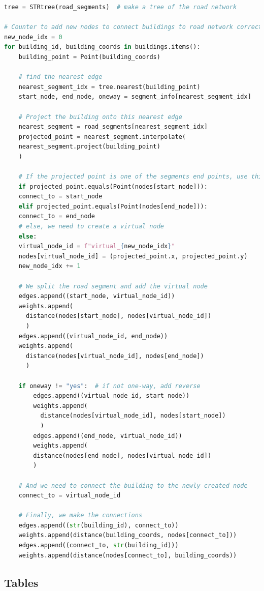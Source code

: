 \documentclass[12pt]{article}
\numberwithin{equation}{section}
\newcommand{\1}[1]{\,I_{#1}} %
\begin{document}
\begin{lstlisting}[language=Python, caption={The algorithm to extract the edges to connect the buildings to the road network}, label={lst:python-edges}]
tree = STRtree(road_segments)  # make a tree of the road network

# Counter to add new nodes to connect buildings to road network correctly
new_node_idx = 0
for building_id, building_coords in buildings.items():
    building_point = Point(building_coords)

    # find the nearest edge
    nearest_segment_idx = tree.nearest(building_point)  
    start_node, end_node, oneway = segment_info[nearest_segment_idx]

    # Project the building onto this nearest edge
    nearest_segment = road_segments[nearest_segment_idx]
    projected_point = nearest_segment.interpolate(
	nearest_segment.project(building_point)
    )

    # If the projected point is one of the segments end points, use this
    if projected_point.equals(Point(nodes[start_node])):
	connect_to = start_node
    elif projected_point.equals(Point(nodes[end_node])):
	connect_to = end_node
    # else, we need to create a virtual node
    else:
	virtual_node_id = f"virtual_{new_node_idx}"
	nodes[virtual_node_id] = (projected_point.x, projected_point.y)
	new_node_idx += 1

	# We split the road segment and add the virtual node
	edges.append((start_node, virtual_node_id))
	weights.append(
	  distance(nodes[start_node], nodes[virtual_node_id])
	  )
	edges.append((virtual_node_id, end_node))
	weights.append(
	  distance(nodes[virtual_node_id], nodes[end_node])
	  )

	if oneway != "yes":  # if not one-way, add reverse
	    edges.append((virtual_node_id, start_node))
	    weights.append(
	      distance(nodes[virtual_node_id], nodes[start_node])
	      )
	    edges.append((end_node, virtual_node_id))
	    weights.append(
	    distance(nodes[end_node], nodes[virtual_node_id])
	    )

	# And we need to connect the building to the newly created node
	connect_to = virtual_node_id

    # Finally, we make the connections
    edges.append((str(building_id), connect_to))
    weights.append(distance(building_coords, nodes[connect_to]))
    edges.append((connect_to, str(building_id)))
    weights.append(distance(nodes[connect_to], building_coords))
\end{lstlisting}
\subsection{Tables}

\end{document}
